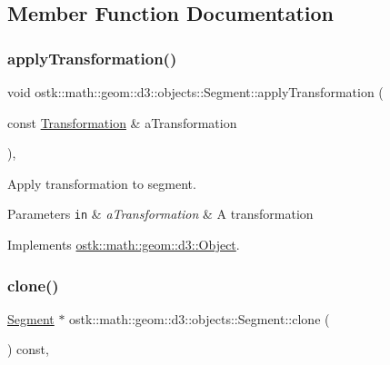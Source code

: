 \subsection{Member Function Documentation}
\mbox{\label{classostk_1_1math_1_1geom_1_1d3_1_1objects_1_1_segment_a5d2aba754d42c89224c7579944de9c4f}} 
\subsubsection{\texorpdfstring{apply\+Transformation()}{applyTransformation()}}
{\footnotesize\ttfamily void ostk\+::math\+::geom\+::d3\+::objects\+::\+Segment\+::apply\+Transformation (\begin{DoxyParamCaption}\item[{const \hyperlink{classostk_1_1math_1_1geom_1_1d3_1_1_transformation}{Transformation} \&}]{a\+Transformation }\end{DoxyParamCaption})\hspace{0.3cm}{\ttfamily [override]}, {\ttfamily [virtual]}}



Apply transformation to segment. 


\begin{DoxyParams}[1]{Parameters}
\mbox{\tt in}  & {\em a\+Transformation} & A transformation \\
\hline
\end{DoxyParams}


Implements \hyperlink{classostk_1_1math_1_1geom_1_1d3_1_1_object_ae9194dd6d2bb4df09292ffc84dccdb1d}{ostk\+::math\+::geom\+::d3\+::\+Object}.

\mbox{\label{classostk_1_1math_1_1geom_1_1d3_1_1objects_1_1_segment_ab6d2215382c1b9fbdbd98501956d679d}} 
\subsubsection{\texorpdfstring{clone()}{clone()}}
{\footnotesize\ttfamily \hyperlink{classostk_1_1math_1_1geom_1_1d3_1_1objects_1_1_segment}{Segment} $\ast$ ostk\+::math\+::geom\+::d3\+::objects\+::\+Segment\+::clone (\begin{DoxyParamCaption}{ }\end{DoxyParamCaption}) const\hspace{0.3cm}{\ttfamily [override]}, {\ttfamily [virtual]}}



